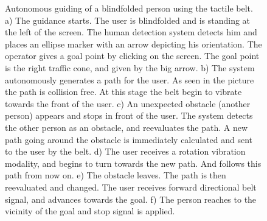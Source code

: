 \begin{figure}[ht!]
{        }
    \caption{%
	Autonomous guiding of a blindfolded person using the tactile belt. a) The guidance starts. The user is blindfolded and is standing at the left of the screen. The human detection system detects him and places an ellipse marker with an arrow depicting his orientation. The operator gives a goal point by clicking on the screen. The goal point is the right traffic cone, and given by the big arrow. b) The system autonomously generates a path for the user. As seen in the picture the path is collision free. At this stage the belt begin to vibrate towards the front of the user. c) An unexpected obstacle (another person) appears and stops in front of the user. The system detects the other person as an obstacle, and reevaluates the path. A new path going around the obstacle is immediately calculated and sent to the user by the belt. d) The user receives a rotation vibration modality, and begins to turn towards the new path. And follows this path from now on. e) The obstacle leaves. The path is then reevaluated and changed. The user receives forward directional belt signal, and advances towards the goal. f) The person reaches to the vicinity of the goal and stop signal is applied.
     }%
   \label{fig:blindguidepics}
\end{figure}

